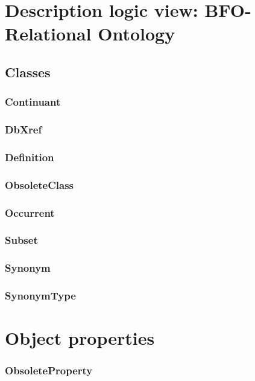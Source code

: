 \documentclass{article}
\begin{document}
\section*{Description logic view: BFO-Relational Ontology}

\subsection*{Classes}

\subsubsection*{Continuant}

\subsubsection*{DbXref}

\subsubsection*{Definition}

\subsubsection*{ObsoleteClass}

\subsubsection*{Occurrent}

\subsubsection*{Subset}

\subsubsection*{Synonym}

\subsubsection*{SynonymType}

\section*{Object properties}\subsubsection*{ObsoleteProperty}
\end{document}
